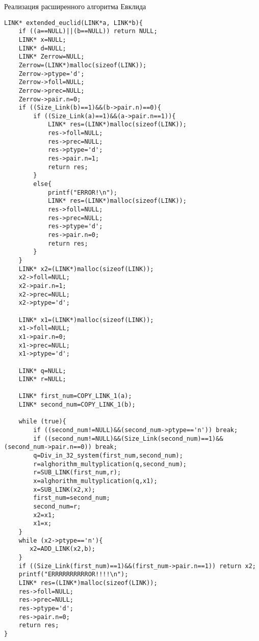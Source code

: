 \documentclass[14pt, russian]{scrartcl}
\begin{document}
\newpage
\begin{code}
\caption{Реализация расширенного алгоритма Евклида}
\label{lst:octaladd}
\begin{verbatim}
LINK* extended_euclid(LINK*a, LINK*b){
    if ((a==NULL)||(b==NULL)) return NULL;
    LINK* x=NULL;
    LINK* d=NULL;
    LINK* Zerrow=NULL;
    Zerrow=(LINK*)malloc(sizeof(LINK));
    Zerrow->ptype='d';
    Zerrow->foll=NULL;
    Zerrow->prec=NULL;
    Zerrow->pair.n=0;
    if ((Size_Link(b)==1)&&(b->pair.n)==0){
        if ((Size_Link(a)==1)&&(a->pair.n==1)){
            LINK* res=(LINK*)malloc(sizeof(LINK));
            res->foll=NULL;
            res->prec=NULL;
            res->ptype='d';
            res->pair.n=1;
            return res;
        }
        else{
            printf("ERROR!\n");
            LINK* res=(LINK*)malloc(sizeof(LINK));
            res->foll=NULL;
            res->prec=NULL;
            res->ptype='d';
            res->pair.n=0;
            return res;
        }
    }
    LINK* x2=(LINK*)malloc(sizeof(LINK));
    x2->foll=NULL;
    x2->pair.n=1;
    x2->prec=NULL;
    x2->ptype='d';

    LINK* x1=(LINK*)malloc(sizeof(LINK));
    x1->foll=NULL;
    x1->pair.n=0;
    x1->prec=NULL;
    x1->ptype='d';

    LINK* q=NULL;
    LINK* r=NULL;

    LINK* first_num=COPY_LINK_1(a);
    LINK* second_num=COPY_LINK_1(b);

    while (true){
        if ((second_num!=NULL)&&(second_num->ptype=='n')) break;
        if ((second_num!=NULL)&&(Size_Link(second_num)==1)&&(second_num->pair.n==0)) break;
        q=Div_in_32_system(first_num,second_num);
        r=alghorithm_multyplication(q,second_num);
        r=SUB_LINK(first_num,r);
        x=alghorithm_multyplication(q,x1);
        x=SUB_LINK(x2,x); 
        first_num=second_num;
        second_num=r;
        x2=x1;
        x1=x;    
    }
    while (x2->ptype=='n'){
       x2=ADD_LINK(x2,b);
    }
    if ((Size_Link(first_num)==1)&&(first_num->pair.n==1)) return x2;
    printf("ERRRRRRRRRROR!!!!\n");
    LINK* res=(LINK*)malloc(sizeof(LINK));
    res->foll=NULL;
    res->prec=NULL;
    res->ptype='d';
    res->pair.n=0;
    return res;
}
\end{verbatim}
\end{code}
\end{document}
